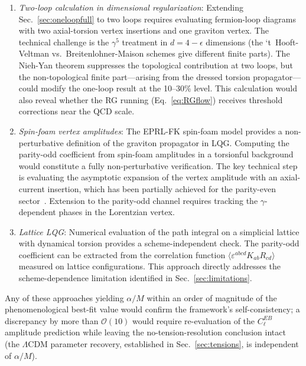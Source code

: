 \documentclass[aps,prd,twocolumn,superscriptaddress,showpacs,preprintnumbers,nofootinbib,longbibliography,floatfix]{revtex4-2}
\begin{document}
\begin{enumerate}[leftmargin=*]
\item \textit{Two-loop calculation in dimensional regularization}: Extending Sec.~\ref{sec:oneloopfull} to two loops requires evaluating fermion-loop diagrams with two axial-torsion vertex insertions and one graviton vertex. The technical challenge is the $\gamma^5$ treatment in $d=4-\epsilon$ dimensions (the `t~Hooft-Veltman vs.\ Breitenlohner-Maison schemes give different finite parts). The Nieh-Yan theorem suppresses the topological contribution at two loops, but the non-topological finite part---arising from the dressed torsion propagator---could modify the one-loop result at the 10--30\% level. This calculation would also reveal whether the RG running (Eq.~\ref{eq:RGflow}) receives threshold corrections near the QCD scale.

\item \textit{Spin-foam vertex amplitudes}: The EPRL-FK spin-foam model provides a non-perturbative definition of the graviton propagator in LQG. Computing the parity-odd coefficient from spin-foam amplitudes in a torsionful background would constitute a fully non-perturbative verification. The key technical step is evaluating the asymptotic expansion of the vertex amplitude with an axial-current insertion, which has been partially achieved for the parity-even sector~\cite{Ashtekar2011}. Extension to the parity-odd channel requires tracking the $\gamma$-dependent phases in the Lorentzian vertex.

\item \textit{Lattice LQG}: Numerical evaluation of the path integral on a simplicial lattice with dynamical torsion provides a scheme-independent check. The parity-odd coefficient can be extracted from the correlation function $\langle\varepsilon^{abcd}K_{ab}R_{cd}\rangle$ measured on lattice configurations. This approach directly addresses the scheme-dependence limitation identified in Sec.~\ref{sec:limitations}.
\end{enumerate}

Any of these approaches yielding $\alpha/M$ within an order of magnitude of the phenomenological best-fit value would confirm the framework's self-consistency; a discrepancy by more than $\mathcal{O}(10)$ would require re-evaluation of the $C_\ell^{EB}$ amplitude prediction while leaving the no-tension-resolution conclusion intact (the $\Lambda$CDM parameter recovery, established in Sec.~\ref{sec:tensions}, is independent of $\alpha/M$).
\end{document}
